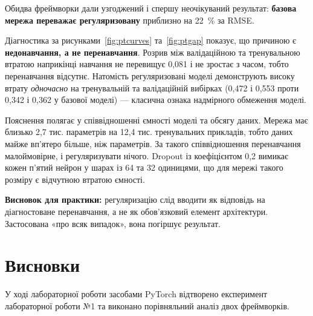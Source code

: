 \documentclass[14pt,a4paper]{extreport}
\begin{document}
Обидва фреймворки дали узгоджений і спершу неочікуваний результат: \textbf{базова мережа переважає регуляризовану} приблизно на 22~\% за RMSE.

Діагностика за рисунками~\ref{fig:ptcurves} та~\ref{fig:ptgap} показує, що причиною є \textbf{недонавчання, а не перенавчання}. Розрив між валідаційною та тренувальною втратою наприкінці навчання не перевищує 0,081 і не зростає з часом, тобто перенавчання відсутнє. Натомість регуляризовані моделі демонструють високу втрату \textit{одночасно} на тренувальній та валідаційній вибірках (0,472 і 0,553 проти 0,342 і 0,362 у базової моделі) --- класична ознака надмірного обмеження моделі.

Пояснення полягає у співвідношенні ємності моделі та обсягу даних. Мережа має близько 2,7 тис. параметрів на 12,4 тис. тренувальних прикладів, тобто даних майже вп'ятеро більше, ніж параметрів. За такого співвідношення перенавчання малоймовірне, і регуляризувати нічого. Dropout із коефіцієнтом 0,2 вимикає кожен п'ятий нейрон у шарах із 64 та 32 одиницями, що для мережі такого розміру є відчутною втратою ємності.

\textbf{Висновок для практики:} регуляризацію слід вводити як відповідь на діагностоване перенавчання, а не як обов'язковий елемент архітектури. Застосована «про всяк випадок», вона погіршує результат.

\section{Висновки}

У ході лабораторної роботи засобами PyTorch відтворено експеримент лабораторної роботи №1 та виконано порівняльний аналіз двох фреймворків.
\end{document}
